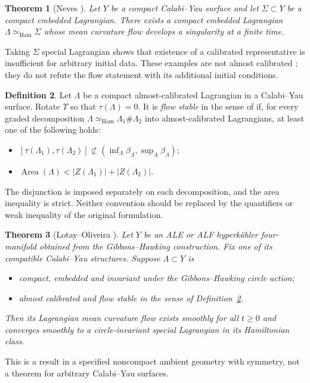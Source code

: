 \documentclass[12pt,reqno]{amsart}
\numberwithin{equation}{section}
\theoremstyle{plain}
\newtheorem{theorem}{Theorem}[section]
\theoremstyle{definition}
\newtheorem{definition}[theorem]{Definition}
\begin{document}
\begin{theorem}[Neves {\cite[Theorem 6.1]{Nev13}}]
\label{thm-Neves}
Let $Y$ be a compact Calabi--Yau surface and let $\Sigma\subset Y$ be a compact
embedded Lagrangian. There exists a compact embedded Lagrangian
$\Lambda\simeq_{\mathrm{Ham}}\Sigma$ whose mean curvature flow develops
a singularity at a finite time.
\end{theorem}
Taking $\Sigma$ special Lagrangian shows that existence of a calibrated
representative is insufficient for arbitrary initial data. These
examples are not almost calibrated
\cite[Remark 1.3(4)]{Nev13}; they do not refute the flow statement with
its additional initial conditions.

\begin{definition}\label{def-flow-stability}
Let $\Lambda$ be a compact almost-calibrated Lagrangian in a
Calabi--Yau surface. Rotate $\Upsilon$ so that $\tau(\Lambda)=0$.
It is \emph{flow stable} in the sense of
\cite[Definition 6.2]{LO24} if, for every graded decomposition
$\Lambda\simeq_{\mathrm{Ham}}\Lambda_1\#\Lambda_2$ into
almost-calibrated Lagrangians, at least one of the following holds:
\begin{itemize}
\item
$[\tau(\Lambda_1),\tau(\Lambda_2)]
 \not\subset(\inf_\Lambda\beta_\Lambda,\sup_\Lambda\beta_\Lambda)$;
\item
$\operatorname{Area}(\Lambda)
 <|Z(\Lambda_1)|+|Z(\Lambda_2)|$.
\end{itemize}
\end{definition}
The disjunction is imposed separately on each decomposition, and the
area inequality is strict. Neither convention should be replaced by
the quantifiers or weak inequality of the original formulation.

\begin{theorem}[Lotay--Oliveira {\cite[Theorem 1.2]{LO24}}]
\label{thm-LO}
Let $Y$ be an ALE or ALF hyperk\"ahler four-manifold obtained from the
Gibbons--Hawking construction. Fix one of its compatible Calabi--Yau
structures. Suppose $\Lambda\subset Y$ is
\begin{itemize}
\item compact, embedded and invariant under the Gibbons--Hawking circle action;
\item almost calibrated and flow stable in the sense of
Definition~\ref{def-flow-stability}.
\end{itemize}
Then its Lagrangian mean curvature flow exists smoothly for all
$t\geq0$ and converges smoothly to a circle-invariant special Lagrangian
in its Hamiltonian class.
\end{theorem}
This is a result in a specified noncompact ambient geometry with
symmetry, not a theorem for arbitrary Calabi--Yau surfaces.
\end{document}
